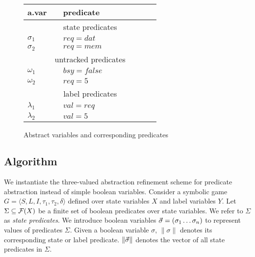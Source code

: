 \begin{figure}
    \caption{Abstract variables and corresponding predicates}
    \begin{tabular}{|p{0.14\linewidth}|p{0.5\linewidth}|}
        \hline
        {\bf a.var} & {\bf predicate} \\
        \hline\hline
        \multicolumn{2}{|c|}{state predicates} \\
        \hline
        $\sigma_1$ & $req=dat$   \\
        $\sigma_2$ & $req=mem$   \\
        \hline\hline
        \multicolumn{2}{|c|}{untracked predicates} \\
        \hline
        $\omega_1$ & $bsy=false$ \\
        $\omega_2$ & $req=5$     \\
        \hline\hline
        \multicolumn{2}{|c|}{label predicates} \\
        \hline
        $\lambda_1$ & $val=req$  \\
        $\lambda_2$ & $val=5$    \\
        \hline
    \end{tabular}
\end{figure}

\subsection{Algorithm}

We instantiate the three-valued abstraction refinement scheme for predicate abstraction instead of simple boolean variables. Consider a symbolic game $G = \langle S, L, I, \tau_1, \tau_2, \delta \rangle$ defined over state variables $X$ and label variables $Y$. Let $\Sigma\subseteq\mathcal{F}(X)$ be a finite set of boolean predicates over state variables. We refer to $\Sigma$ as \emph{state predicates}. We introduce boolean variables $\vec{\sigma}=(\sigma_1\ldots\sigma_n)$ to represent values of predicates $\Sigma$. Given a boolean variable $\sigma$, $\|\sigma\|$ denotes its corresponding state or label predicate. $\|\vec{\sigma}\|$ denotes the vector of all state predicates in $\Sigma$.


